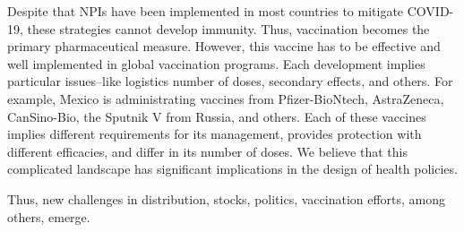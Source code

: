         Despite that NPIs have been implemented in most countries 
    to mitigate COVID-19, these strategies cannot develop immunity. 
    Thus, vaccination becomes the primary pharmaceutical measure. 
    However, this vaccine has to be effective and well implemented 
    in global vaccination programs. Each development implies 
    particular issues--like logistics number of doses, 
    secondary effects, and others. For example, Mexico is 
    administrating vaccines from Pfizer-BioNtech, AstraZeneca, 
    CanSino-Bio, the Sputnik V from Russia, and others. 
    Each of these vaccines implies different requirements 
    for its management, provides protection with different 
    efficacies, and differ in its number of doses. We believe
    that this complicated landscape has significant implications
    in the design of health policies.

        Thus, new challenges in distribution, stocks, politics, 
    vaccination efforts, among others, emerge.     
    